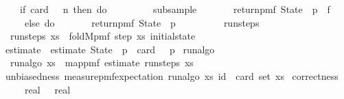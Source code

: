 \begin{algorithm}[h]
\begin{isabelle_cm}
\isanewline
\ \ \ \ if\ card\ {\isasymchi}\ {\isacharequal}{\kern0pt}\ n\ then\ do\ {\isacharbraceleft}{\kern0pt}\isanewline
\ \ \ \ \ \ {\isasymchi}\ {\isasymleftarrow}\ subsample\ {\isasymchi}{\isacharsemicolon}{\kern0pt}\isanewline
\ \ \ \ \ \ return{\isacharunderscore}{\kern0pt}pmf\ {\isacharparenleft}{\kern0pt}State\ {\isasymchi}\ {\isacharparenleft}{\kern0pt}p\ {\isacharasterisk}{\kern0pt}\ f{\isacharparenright}{\kern0pt}{\isacharparenright}{\kern0pt}\isanewline
\ \ \ \ {\isacharbraceright}{\kern0pt}\ else\ do\ {\isacharbraceleft}{\kern0pt}\isanewline
\ \ \ \ \ \ return{\isacharunderscore}{\kern0pt}pmf\ {\isacharparenleft}{\kern0pt}State\ {\isasymchi}\ p{\isacharparenright}{\kern0pt}\isanewline
\ \ \ \ {\isacharbraceright}{\kern0pt}\isanewline
\ \ \ {\isacharbraceright}{\kern0pt}{\isacartoucheclose}\isanewline
\isanewline
{}\isamarkupfalse%
\ run{\isacharunderscore}{\kern0pt}steps\ \ %
\hfill{}\isanewline
\ \ {\isacartoucheopen}run{\isacharunderscore}{\kern0pt}steps\ xs\ {\isacharequal}{\kern0pt}\ foldM{\isacharunderscore}{\kern0pt}pmf\ step\ xs\ initial{\isacharunderscore}{\kern0pt}state{\isacartoucheclose}\isanewline
{}\isamarkupfalse%
\ estimate\ \ 
{\isacartoucheopen}estimate\ {\isacharparenleft}{\kern0pt}State\ {\isasymchi}\ p{\isacharparenright}{\kern0pt}\ {\isacharequal}{\kern0pt}\ card\ {\isasymchi}\ {\isacharslash}{\kern0pt}\ p{\isacartoucheclose}\isanewline
\isacommand{fun}\isamarkupfalse%
\ run{\isacharunderscore}{\kern0pt}algo\ \ %
\hfill{}\isanewline
\ \ {\isacartoucheopen}run{\isacharunderscore}{\kern0pt}algo\ xs\ {\isacharequal}{\kern0pt}\ map{\isacharunderscore}{\kern0pt}pmf\ estimate\ {\isacharparenleft}{\kern0pt}run{\isacharunderscore}{\kern0pt}steps\ xs{\isacharparenright}{\kern0pt}{\isacartoucheclose}\isanewline
\isanewline
{}\isamarkupfalse%
\ unbiasedness{\isacharcolon}{\kern0pt}\ {\isacartoucheopen}measure{\isacharunderscore}{\kern0pt}pmf{\isachardot}{\kern0pt}expectation\ {\isacharparenleft}{\kern0pt}run{\isacharunderscore}{\kern0pt}algo\ xs{\isacharparenright}{\kern0pt}\ id\ {\isacharequal}{\kern0pt}\ card\ {\isacharparenleft}{\kern0pt}set\ xs{\isacharparenright}{\kern0pt}{\isacartoucheclose}\isanewline
\isanewline
{}\isamarkupfalse%
\ correctness{\isacharcolon}{\kern0pt}\isanewline
\ \ \ {\isacartoucheopen}{\isasymepsilon}\ {\isasymin}\ {\isacharbraceleft}{\kern0pt}{}{\isacharless}{\kern0pt}{\isachardot}{\kern0pt}{\isachardot}{\kern0pt}{\isacharless}{\kern0pt}{}{\isacharcolon}{\kern0pt}{\isacharcolon}{\kern0pt}real{\isacharbraceright}{\kern0pt}{\isacartoucheclose}\ {\isacartoucheopen}{\isasymdelta}\ {\isasymin}\ {\isacharbraceleft}{\kern0pt}{}{\isacharless}{\kern0pt}{\isachardot}{\kern0pt}{\isachardot}{\kern0pt}{\isacharless}{\kern0pt}{}{\isacharcolon}{\kern0pt}{\isacharcolon}{\kern0pt}real{\isacharbraceright}{\kern0pt}{\isacartoucheclose}\isanewline

\end{isabelle_cm}
\end{algorithm}
